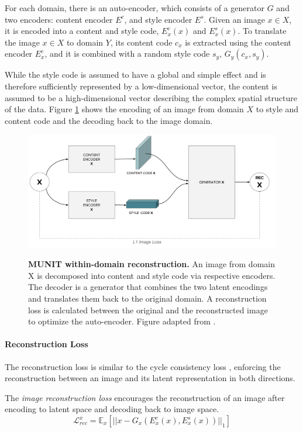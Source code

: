 \documentclass[12pt]{report}
\begin{document}
For each domain, there is an auto-encoder, which consists of a generator $G$ and two encoders: content encoder $E^c$, and style encoder $E^s$. Given an image $x \in X$, it is encoded into a content and style code, $E^c_x(x)$ and $E^s_x(x)$. To translate the image $x \in X$ to domain $Y$, its content code $c_{x}$ is extracted using the content encoder $E^c_x$, and it is combined with a random style code $s_{y}$, $G_y(c_x, s_y)$. 

While the style code is assumed to have a global and simple effect and is therefore sufficiently represented by a low-dimensional vector, the content is assumed to be a high-dimensional vector describing the complex spatial structure of the data. Figure \ref{fig:munit_enc} shows the encoding of an image from domain $X$ to style and content code and the decoding back to the image domain.

\begin{figure}[h]
\centering
{\includegraphics[width=\linewidth]{03_analysis/gans/munit_enc}}
\caption{\label{fig:munit_enc} \textbf{MUNIT within-domain reconstruction.}  An image from domain X is decomposed into content and style code via respective encoders. The decoder is a generator that combines the two latent encodings and translates them back to the original domain. A reconstruction loss is calculated between the original and the reconstructed image to optimize the auto-encoder. Figure adapted from \cite{huang_multimodal_2018}.}
\end{figure}

\paragraph{Reconstruction Loss}
The reconstruction loss is similar to the cycle consistency loss \cite{zhu_unpaired_2017}, enforcing the reconstruction between an image and its latent representation in both directions. 

The \textit{image reconstruction loss} encourages the reconstruction of an image after encoding to latent space and decoding back to image space.
\begin{equation}
\mathcal{L}^{x}_{rec} = \mathbb{E}_{x}[||x - G_{x}(E^{c}_{x}(x), E^{s}_{x}(x))||_{1}]
\end{equation}
\end{document}
